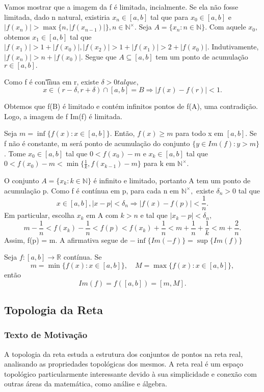 \documentclass[analysis_notes.tex]{subfiles}
\begin{document}
\begin{proof*}
	Vamos mostrar que a imagem da f \'e limitada, incialmente. Se ela n\~ao fosse limitada, dado n natural, existiria $x_{n}\in[a, b]$
	tal que para $x_{0}\in[a, b]$ e $|f(x_{n})| > \max{\{n, |f(x_{n-1})|\}}, n\in \mathbb{N}^{\times}.$ Seja $A=\{x_{n}:n\in \mathbb{N}\}$.
	Com aquele $x_{0},$ obtemos $x_{1}\in[a, b]$ tal que $|f(x_{1})| > 1 + |f(x_{0})|, |f(x_{2})| > 1 + |f(x_{1})| > 2 + |f(x_{0})|.$
	Indutivamente, $|f(x_{n})| > n + |f(x_{0})|.$ Segue que $A\subseteq{[a, b]}$ tem um ponto de acumula\c c\~ao $r\in[a, b].$

	Como f \'e con\t'inua em r, existe $\delta > 0 tal que,$
	$$
		x\in(r-\delta , r+\delta )\cap[a, b] = B \Rightarrow |f(x)-f(r)|<1.
	$$

	Obtemos que f(B) \'e limitado e cont\'em infinitos pontos de f(A), uma contradi\c c\~ao. Logo, a imagem de f Im(f) \'e limitada.

	Seja $m=\inf{\{f(x):x\in[a, b]\}}$. Ent\~ao, $f(x)\geq m$ para todo x em $[a, b].$ Se f n\~ao \'e constante, m ser\'a ponto de
	acumula\c c\~ao do conjunto $\{y\in{Im(f)}: y > m\}$. Tome $x_{0}\in[a, b]$ tal que $0 < f(x_{0}) - m$ e $x_{k}\in[a, b]$
	tal que $0 < f(x_{0}) - m < \min{\{\frac{1}{k}, f(x_{k-1})-m\}}$ para k em $\mathbb{N}^{\times}.$

	O conjunto $A = \{x_{k}: k\in \mathbb{N}\}$ \'e infinito e limitado, portanto A tem um ponto de acumula\c c\~ao p. Como f \'e cont\'inua
	em p, para cada n em $\mathbb{N}^{\times},$ existe $\delta_{n} > 0$ tal que
	$$
		x\in[a, b], |x-p|<\delta_{n} \Rightarrow |f(x)-f(p)|<\frac{1}{n}.
	$$
	Em particular, escolha $x_{k}$ em A com $k>n$ e tal que $|x_{k}-p|<\delta_{n},$
	$$
		m-\frac{1}{n} < f(x_{k})-\frac{1}{n}<f(p)<f(x_{k}) + \frac{1}{n} < m + \frac{1}{n} + \frac{1}{k} < m + \frac{2}{n}.
	$$
	Assim, f(p) = m. A afirmativa segue de $-\inf{\{Im(-f)\}} = \sup\{Im(f)\}$ \qedsymbol
\end{proof*}
\begin{crl*}
	Seja $f:[a, b]\rightarrow \mathbb{R}$ cont\'inua. Se
	$$
		m=\min{\{f(x):x\in[a, b]\}},\quad M = \max{\{f(x):x\in[a, b]\}},
	$$
	ent\~ao
	$$
		Im(f) = f([a, b]) = [m, M].
	$$
\end{crl*}

\subsection{Topologia da Reta}
\subsubsection{Texto de Motiva\c c\~ao}
A topologia da reta estuda a estrutura dos conjuntos de pontos na reta real, analisando as propriedades topológicas dos mesmos. A reta real é um espaço topológico particularmente interessante devido à sua simplicidade e conexão com outras áreas da matemática, como análise e álgebra.
\end{document}
